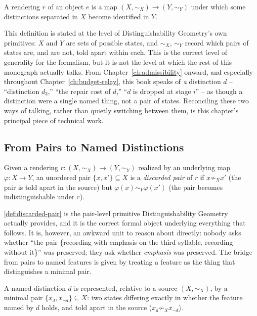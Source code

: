 \begin{definition}
\label{def:rendering}
A rendering $r$ of an object $e$ is a map $(X,\sim_X) \to (Y,\sim_Y)$
under which some distinctions separated in $X$ become identified in $Y$.
\end{definition}

This definition is stated at the level of Distinguishability Geometry's
own primitives: $X$ and $Y$ are sets of possible states, and $\sim_X$,
$\sim_Y$ record which pairs of states are, and are not, told apart within
each. This is the correct level of generality for the formalism, but it is
not the level at which the rest of this monograph actually talks. From
Chapter~\ref{ch:admissibility} onward, and especially throughout
Chapter~\ref{ch:budget-relay}, this book speaks of \emph{a} distinction
$d$ -- ``distinction $d_3$,'' ``the repair cost of $d$,'' ``$d$ is dropped
at stage $i$'' -- as though a distinction were a single named thing, not a
pair of states. Reconciling these two ways of talking, rather than
quietly switching between them, is this chapter's principal piece of
technical work.

\subsection{From Pairs to Named Distinctions}

\begin{definition}
\label{def:discarded-pair}
Given a rendering $r: (X,\sim_X) \to (Y,\sim_Y)$ realized by an underlying
map $\varphi: X \to Y$, an unordered pair $\{x, x'\} \subseteq X$ is a
\emph{discarded pair} of $r$ if $x \not\sim_X x'$ (the pair is told apart
in the source) but $\varphi(x) \sim_Y \varphi(x')$ (the pair becomes
indistinguishable under $r$).
\end{definition}

\cref{def:discarded-pair} is the pair-level primitive Distinguishability
Geometry actually provides, and it is the correct formal object underlying
everything that follows. It is, however, an awkward unit to reason about
directly: nobody asks whether ``the pair \{recording with emphasis on the
third syllable, recording without it\}'' was preserved; they ask whether
\emph{emphasis} was preserved. The bridge from pairs to named features is
given by treating a feature as the thing that distinguishes a minimal pair.

\begin{definition}
\label{def:minimal-pair}
A named distinction $d$ is represented, relative to a source $(X,\sim_X)$,
by a minimal pair $\{x_d, x_{\neg d}\} \subseteq X$: two states differing
exactly in whether the feature named by $d$ holds, and told apart in the
source ($x_d \not\sim_X x_{\neg d}$).
\end{definition}

